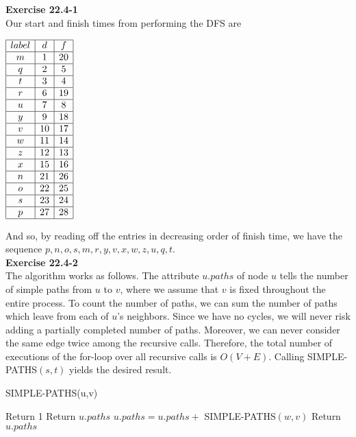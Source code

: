 \documentclass{article}
\begin{document}
\noindent\textbf{Exercise 22.4-1}\\

Our start and finish times from performing the DFS are

\begin{center}
$
\begin{array}{|c|c|c|}
\hline
label & d&f\\
\hline
m&1&20\\
\hline
q&2&5\\
\hline
t&3&4\\
\hline
r&6&19\\
\hline
u&7&8\\
\hline
y&9&18\\
\hline
v&10&17\\
\hline
w&11&14\\
\hline
z&12&13\\
\hline
x&15&16\\
\hline
n&21&26\\
\hline
o&22&25\\
\hline
s&23&24\\
\hline
p&27&28\\
\hline
\end{array}
$
\end{center}

And so, by reading off the entries in decreasing order of finish time, we have the sequence $p,n,o,s,m,r,y,v,x,w,z,u,q,t$.\\

\noindent\textbf{Exercise 22.4-2}\\

The algorithm works as follows.  The attribute $u.paths$ of node $u$ tells the number of simple paths from $u$ to $v$, where we assume that $v$ is fixed throughout the entire process.  To count the number of paths, we can sum the number of paths which leave from each of $u$'s neighbors.  Since we have no cycles, we will never risk adding a partially completed number of paths.   Moreover, we can never consider the same edge twice among the recursive calls.  Therefore, the total number of executions of the for-loop over all recursive calls is $O(V + E)$.  Calling SIMPLE-PATHS$(s,t)$ yields the desired result. \\
\begin{algorithm}
\caption{SIMPLE-PATHS(u,v)}
\begin{algorithmic}[1]
	\State Return 1
	\State Return $u.paths$
\Else
		\State $u.paths = u.paths +$ SIMPLE-PATHS$(w,v)$
	\EndFor
	\State Return $u.paths$
\EndIf
\end{algorithmic}
\end{algorithm}
\end{document}
